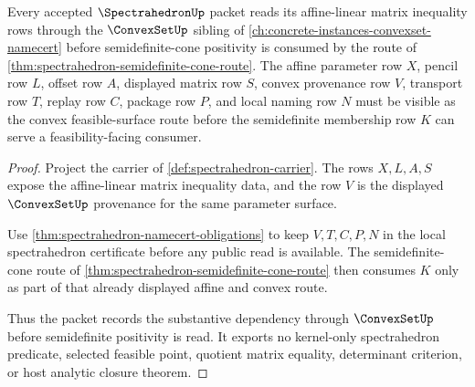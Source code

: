 \begin{theorem}
\label{thm:spectrahedron-convex-set-forward-route}
Every accepted $\SpectrahedronUp$ packet reads its affine-linear matrix inequality rows through the $\ConvexSetUp$ sibling of \autoref{ch:concrete-instances-convexset-namecert} before semidefinite-cone positivity is consumed by the route of \autoref{thm:spectrahedron-semidefinite-cone-route}. The affine parameter row $X$, pencil row $L$, offset row $A$, displayed matrix row $S$, convex provenance row $V$, transport row $T$, replay row $C$, package row $P$, and local naming row $N$ must be visible as the convex feasible-surface route before the semidefinite membership row $K$ can serve a feasibility-facing consumer.
\end{theorem}
\begin{proof}
Project the carrier of \autoref{def:spectrahedron-carrier}. The rows $X,L,A,S$ expose the affine-linear matrix inequality data, and the row $V$ is the displayed $\ConvexSetUp$ provenance for the same parameter surface.

Use \autoref{thm:spectrahedron-namecert-obligations} to keep $V,T,C,P,N$ in the local spectrahedron certificate before any public read is available. The semidefinite-cone route of \autoref{thm:spectrahedron-semidefinite-cone-route} then consumes $K$ only as part of that already displayed affine and convex route.

Thus the packet records the substantive dependency through $\ConvexSetUp$ before semidefinite positivity is read. It exports no kernel-only spectrahedron predicate, selected feasible point, quotient matrix equality, determinant criterion, or host analytic closure theorem.
\end{proof}
